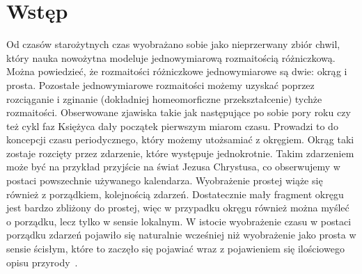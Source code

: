 \newpage
\section{Wstęp}
Od czasów starożytnych czas wyobrażano sobie jako nieprzerwany zbiór chwil, 
który nauka nowożytna modeluje jednowymiarową rozmaitością różniczkową.
Można powiedzieć, że rozmaitości różniczkowe 
 jednowymiarowe są dwie: okrąg i prosta. 
Pozostałe jednowymiarowe rozmaitości możemy uzyskać 
poprzez rozciąganie i zginanie 
(dokładniej homeomorficzne przekształcenie) 
tychże rozmaitości.
Obserwowane zjawiska takie jak 
następujące po sobie pory roku czy też cykl faz 
Księżyca dały początek pierwszym miarom czasu. 
Prowadzi to do koncepcji czasu periodycznego, który możemy 
utożsamiać z okręgiem. 
Okrąg taki zostaje rozcięty przez zdarzenie, które występuje 
jednokrotnie. Takim zdarzeniem może być na przykład 
przyjście na świat Jezusa Chrystusa, co 
obserwujemy w postaci powszechnie 
używanego kalendarza. 
Wyobrażenie prostej wiąże się również z porządkiem, 
kolejnością zdarzeń. 
Dostatecznie mały fragment okręgu jest bardzo zbliżony do
prostej, więc w przypadku okręgu również można myśleć o
 porządku, lecz tylko w sensie lokalnym. 
W istocie wyobrażenie czasu w postaci porządku zdarzeń
pojawiło się naturalnie wcześniej niż wyobrażenie jako prosta 
w sensie ścisłym, które to zaczęło się pojawiać wraz 
z pojawieniem się ilościowego opisu przyrody~\cite{czasHeller}.



